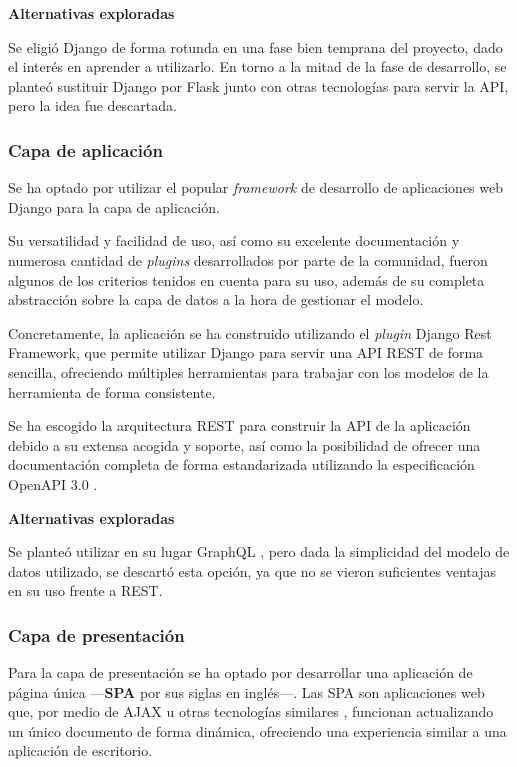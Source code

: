 \documentclass[10pt, a4paper]{aqademic}
\begin{document}
\medskip

\textbf{Alternativas exploradas}

Se eligió Django de forma rotunda en una fase bien temprana del proyecto, dado el interés en aprender a utilizarlo. En torno a la 
mitad de la fase de desarrollo, se planteó sustituir Django por Flask \cite{noauthor_flask_nodate} junto con otras tecnologías para servir 
la API, pero la idea fue descartada.

\subsubsection*{Capa de aplicación}

Se ha optado por utilizar el popular \textit{framework} de desarrollo de aplicaciones web Django para la capa de aplicación.

Su versatilidad y facilidad de uso, así como su excelente documentación y numerosa cantidad de \textit{plugins} 
desarrollados por parte de la comunidad, fueron algunos de los criterios tenidos en cuenta para su uso, además de su completa
abstracción sobre la capa de datos a la hora de gestionar el modelo.

Concretamente, la aplicación se ha construido utilizando el \textit{plugin} Django Rest Framework, que permite utilizar Django para servir
una API REST de forma sencilla, ofreciendo múltiples herramientas para trabajar con los modelos de la herramienta de forma consistente.

Se ha escogido la arquitectura REST para construir la API de la aplicación debido a su extensa acogida y soporte, así como la posibilidad
de ofrecer una documentación completa de forma estandarizada utilizando la especificación OpenAPI 3.0 \cite{miller_openapi_2021}.

\medskip

\textbf{Alternativas exploradas}

Se planteó utilizar en su lugar GraphQL \cite{noauthor_graphql_2018}, pero dada la simplicidad del modelo de datos utilizado, se descartó esta opción,
ya que no se vieron suficientes ventajas en su uso frente a REST.


\subsubsection*{Capa de presentación}

Para la capa de presentación se ha optado por desarrollar una aplicación de página única ---\textbf{SPA} por sus siglas en inglés---. Las SPA son aplicaciones
web que, por medio de AJAX u otras tecnologías similares \cite{van_kesteren_xmlhttprequest_2016}, funcionan actualizando un único documento de forma dinámica, ofreciendo una experiencia similar a una aplicación de escritorio. 
\end{document}
